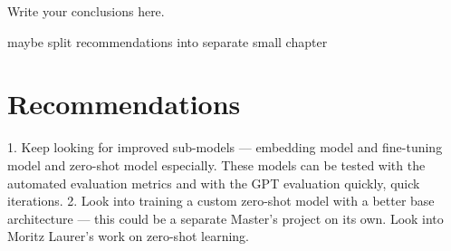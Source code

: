 Write your conclusions here.

maybe split recommendations into separate small chapter

\section{Recommendations}
1. Keep looking for improved sub-models — embedding model and fine-tuning model and zero-shot model especially. These models can be tested with the automated evaluation metrics and with the GPT evaluation quickly, quick iterations.
2. Look into training a custom zero-shot model with a better base architecture — this could be a separate Master's project on its own. Look into Moritz Laurer's work on zero-shot learning.